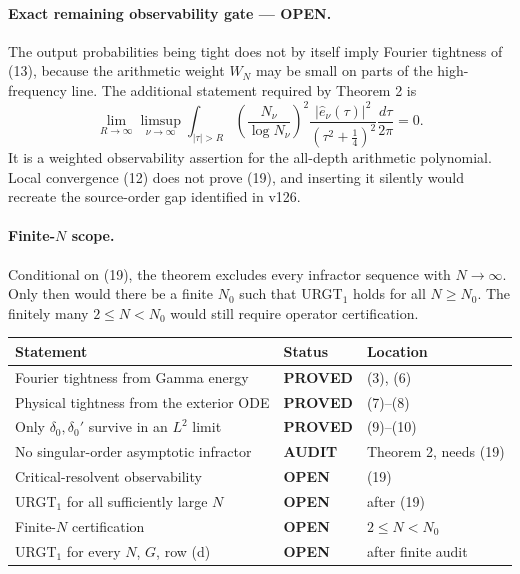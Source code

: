 \documentclass[11pt]{article}
\newcommand{\PROVED}{\textcolor{green!40!black}{\textbf{PROVED}}}
\newcommand{\OPEN}{\textcolor{red!70!black}{\textbf{OPEN}}}
\newcommand{\AUDIT}{\textcolor{orange!70!black}{\textbf{AUDIT}}}
\begin{document}
\paragraph{Exact remaining observability gate --- \OPEN.}
The output probabilities being tight does not by itself imply Fourier
tightness of (13), because the arithmetic weight $W_N$ may be small on
parts of the high-frequency line.  The additional statement required by
Theorem 2 is
\begin{equation}
 \boxed{
 \lim_{R\to\infty}\limsup_{\nu\to\infty}
 \int_{|\tau|>R}
 \left(\frac{N_\nu}{\log N_\nu}\right)^2
 \frac{|\widehat e_\nu(\tau)|^2}{(\tau^2+\frac14)^2}
 \frac{d\tau}{2\pi}=0.}                                   \tag{19}
\end{equation}
It is a weighted observability assertion for the all-depth arithmetic
polynomial.  Local convergence (12) does not prove (19), and inserting it
silently would recreate the source-order gap identified in v126.

\paragraph{Finite-$N$ scope.}
Conditional on (19), the theorem excludes every infractor sequence with
$N\to\infty$.  Only then would there be a finite $N_0$ such that
URGT$_1$ holds for all $N\ge N_0$.  The finitely many $2\le N<N_0$ would
still require operator certification.

\begin{center}
\begin{tabular}{>{\raggedright\arraybackslash}p{.58\linewidth}
                >{\centering\arraybackslash}p{.14\linewidth}
                >{\raggedright\arraybackslash}p{.18\linewidth}}
\toprule
Statement & Status & Location \\
\midrule
Fourier tightness from Gamma energy & \PROVED & (3), (6) \\
Physical tightness from the exterior ODE & \PROVED & (7)--(8) \\
Only $\delta_0,\delta_0'$ survive in an $L^2$ limit & \PROVED & (9)--(10) \\
No singular-order asymptotic infractor & \AUDIT & Theorem 2, needs (19) \\
Critical-resolvent observability & \OPEN & (19) \\
URGT$_1$ for all sufficiently large $N$ & \OPEN & after (19) \\
Finite-$N$ certification & \OPEN & $2\le N<N_0$ \\
URGT$_1$ for every $N$, $G$, row (d) & \OPEN & after finite audit \\
\bottomrule
\end{tabular}
\end{center}
\end{document}
